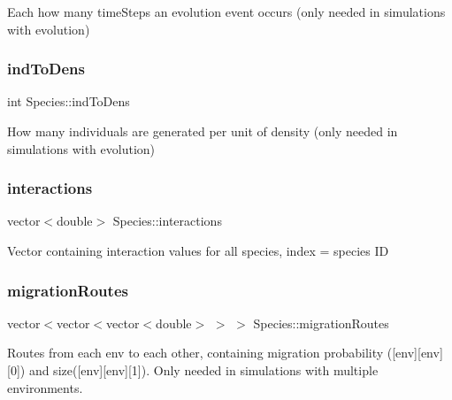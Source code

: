 Each how many time\+Steps an evolution event occurs (only needed in simulations with evolution) \mbox{\label{classSpecies_a3a11f42cb341349dadb706fff06f301d}} 
\subsubsection{\texorpdfstring{ind\+To\+Dens}{indToDens}}
{\footnotesize\ttfamily int Species\+::ind\+To\+Dens\hspace{0.3cm}{\ttfamily [protected]}}

How many individuals are generated per unit of density (only needed in simulations with evolution) \mbox{\label{classSpecies_a2ea9ab3b36448426b237f40dd4a1a18d}} 
\subsubsection{\texorpdfstring{interactions}{interactions}}
{\footnotesize\ttfamily vector$<$double$>$ Species\+::interactions\hspace{0.3cm}{\ttfamily [protected]}}

Vector containing interaction values for all species, index = species ID \mbox{\label{classSpecies_a732dd85466e7156e8e51c7b44ea00f24}} 
\subsubsection{\texorpdfstring{migration\+Routes}{migrationRoutes}}
{\footnotesize\ttfamily vector$<$vector$<$vector$<$double$>$ $>$ $>$ Species\+::migration\+Routes\hspace{0.3cm}{\ttfamily [protected]}}

Routes from each env to each other, containing migration probability (\mbox{[}env\mbox{]}\mbox{[}env\mbox{]}\mbox{[}0\mbox{]}) and size(\mbox{[}env\mbox{]}\mbox{[}env\mbox{]}\mbox{[}1\mbox{]}). Only needed in simulations with multiple environments. \mbox{\label{classSpecies_a11e7aac3c4a85723e8a9d00d00452508}} 
